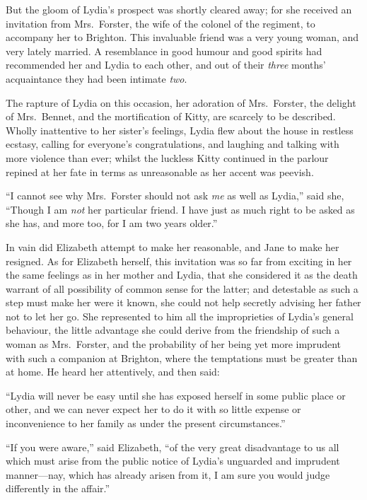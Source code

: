 \documentclass[12pt,english,oneside]{book}
\begin{document}
But the gloom of Lydia's prospect was shortly cleared away; for she
received an invitation from Mrs.\ Forster, the wife of the colonel
of the regiment, to accompany her to Brighton. This invaluable friend
was a very young woman, and very lately married. A resemblance in
good humour and good spirits had recommended her and Lydia to each
other, and out of their \textit{three} months' acquaintance they had
been intimate \textit{two}.

The rapture of Lydia on this occasion, her adoration of Mrs.\ Forster,
the delight of Mrs.\ Bennet, and the mortification of Kitty, are
scarcely to be described. Wholly inattentive to her sister's feelings,
Lydia flew about the house in restless ecstasy, calling for everyone's
congratulations, and laughing and talking with more violence than
ever; whilst the luckless Kitty continued in the parlour repined at
her fate in terms as unreasonable as her accent was peevish.

{}``I cannot see why Mrs.\ Forster should not ask \textit{me} as
well as Lydia,'' said she, {}``Though I am \textit{not} her particular
friend. I have just as much right to be asked as she has, and more
too, for I am two years older.''

In vain did Elizabeth attempt to make her reasonable, and Jane to
make her resigned. As for Elizabeth herself, this invitation was so
far from exciting in her the same feelings as in her mother and Lydia,
that she considered it as the death warrant of all possibility of
common sense for the latter; and detestable as such a step must make
her were it known, she could not help secretly advising her father
not to let her go. She represented to him all the improprieties of
Lydia's general behaviour, the little advantage she could derive from
the friendship of such a woman as Mrs.\ Forster, and the probability
of her being yet more imprudent with such a companion at Brighton,
where the temptations must be greater than at home. He heard her attentively,
and then said:

{}``Lydia will never be easy until she has exposed herself in some
public place or other, and we can never expect her to do it with so
little expense or inconvenience to her family as under the present
circumstances.''

{}``If you were aware,'' said Elizabeth, {}``of the very great
disadvantage to us all which must arise from the public notice of
Lydia's unguarded and imprudent manner\mbox{---}nay, which has already
arisen from it, I am sure you would judge differently in the affair.''
\end{document}

